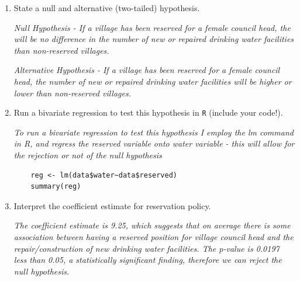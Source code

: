 \documentclass[12pt,letterpaper]{article}
\begin{document}
\newpage
\begin{enumerate}
	\item [(a)] State a null and alternative (two-tailed) hypothesis. 
		\vspace{0.5cm}
		
		\textit{Null Hypothesis - If a village has been reserved for a female council head, the will be no difference in the number of new or repaired drinking water facilities than non-reserved villages.}
		
		\textit{Alternative Hypothesis - If a village has been reserved for a female council head, the number of new or repaired drinking water facilities will be higher or lower than non-reserved villages.}
		
	\vspace{1cm}
	\item [(b)] Run a bivariate regression to test this hypothesis in \texttt{R} (include your code!).
	
	\vspace{0.5cm}
	\textit{To run a bivariate regression to test this hypothesis I employ the lm command in R, and regress the reserved variable onto water variable - this will allow for the rejection or not of the null hypothesis}
	\begin{verbatim}		
	reg <- lm(data$water~data$reserved)
	summary(reg)
	\end{verbatim}

	\vspace{1cm}
	\item [(c)] Interpret the coefficient estimate for reservation policy. 

	\vspace{0.5cm}		
	\textit{The coefficient estimate is 9.25, which suggests that on average there is some association between having a reserved position for village council head and the repair/construction of new drinking water facilities. The p-value is  0.0197 less than 0.05, a statistically significant finding, therefore we can reject the null hypothesis.}
\end{enumerate}


\end{document}
